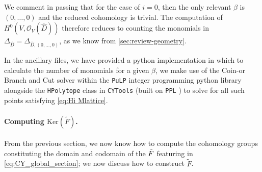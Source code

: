\documentclass[11pt,dvipsnames]{article}
\theoremstyle{definition}
\newcommand{\cO}{\mathcal{O}}
\begin{document}
We comment in passing that for the case of $i = 0$, then the only relevant $\beta$ is $(0, \dots, 0)$ and the reduced cohomology is trivial. The computation of $H^0(V,\cO_V(\hat{D}))$ therefore reduces to counting the monomials in $\Delta_{\hat{D}} = \Delta_{\hat{D}, (0, \dots, 0)}$, as we know from \cref{sec:review-geometry}.

In the ancillary files, we have provided a python implementation in which to calculate the number of monomials for a given $\beta$, we make use of the Coin-or Branch and Cut solver within the \verb+PuLP+ integer programming python library \cite{mitchell2011pulp} alongside the \verb+HPolytope+ class in \verb+CYTools+ (built on \verb+PPL+ \cite{BagnaraHZ08SCP}) to solve for all such points satisfying \cref{eq:Hi Mlattice}. 

\paragraph{Computing $\mathrm{Ker}(\tilde{F})$.}

From the previous section, we now know how to compute the cohomology groups constituting the domain and codomain of the $\Tilde{F}$ featuring in \cref{eq:CY_global_section}; we now discuss how to construct $\tilde{F}$.
\end{document}
